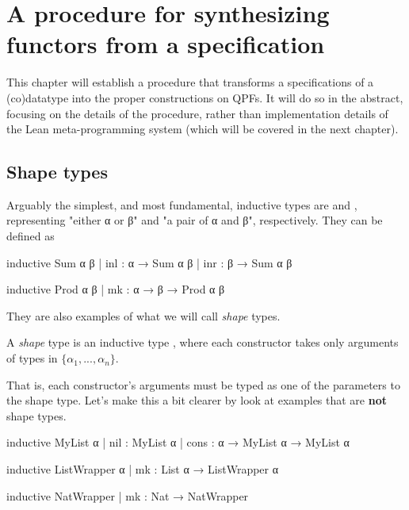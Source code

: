 \documentclass[titlepage]{report}
\newenvironment{definition}[1][Definition:]{\begin{trivlist}                         
    \item[\hskip \labelsep {\bfseries #1}]}{\end{trivlist}}
\begin{document}
\chapter{A procedure for synthesizing functors from a specification}
\label{ch:procedure}

This chapter will establish a procedure that transforms a specifications of a (co)datatype
into the proper constructions on QPFs.
It will do so in the abstract, focusing on the details of the procedure, rather than implementation
details of the Lean meta-programming system (which will be covered in the next chapter).


\section{Shape types}
\label{sec:shape_types}

Arguably the simplest, and most fundamental, inductive types are  and ,
representing "either α or β" and "a pair of α and β", respectively.
They can be defined as

\begin{center}
\begin{minipage}[t]{0.45\linewidth}
    \begin{leancode}
inductive Sum α β
  | inl : α → Sum α β
  | inr : β → Sum α β
    \end{leancode}
\end{minipage}
\begin{minipage}[t]{0.45\linewidth}
    \begin{leancode}    
inductive Prod α β
  | mk : α → β → Prod α β
    \end{leancode}
\end{minipage}
\end{center}

They are also examples of what we will call \emph{shape} types.
\begin{definition}
    A \emph{shape} type is an inductive type , 
    where each constructor takes only arguments of types in $\{α_1, ..., α_n\}$.
\end{definition}
That is, each constructor's arguments must be typed as one of the parameters to the shape type.
Let's make this a bit clearer by look at examples that are \textbf{not} shape types. 

\begin{leancode}
    inductive MyList α
      | nil  : MyList α 
      | cons : α → MyList α → MyList α

    inductive ListWrapper α
      | mk : List α → ListWrapper α

    inductive NatWrapper
      | mk : Nat → NatWrapper
\end{leancode}
\end{document}
